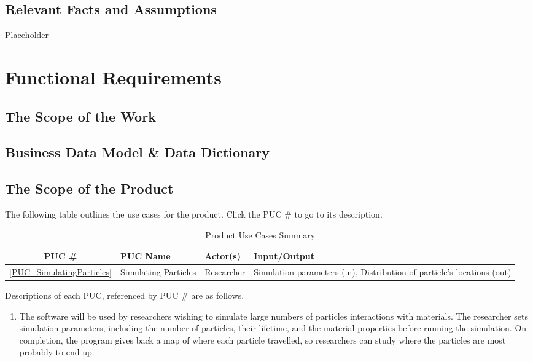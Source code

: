 \documentclass[12pt]{article}
\begin{document}
\subsection{Relevant Facts and Assumptions} %
Placeholder

\section{Functional Requirements}
\subsection{The Scope of the Work} %
\subsection{Business Data Model \& Data Dictionary} %

\subsection{The Scope of the Product}
The following table outlines the use cases for the product. Click the PUC \# to go to its description.

\begin{table}[h]
\centering
\begin{tabularx}{\textwidth}{|c|l|l|X|}
\hline
PUC \# & PUC Name & Actor(s) & Input/Output\\
\hline\hline
\ref{PUC_SimulatingParticles} & Simulating Particles & Researcher & Simulation parameters (in), Distribution of particle's locations (out)\\
\hline
\end{tabularx}
\caption{Product Use Cases Summary}
\end{table}

Descriptions of each PUC, referenced by PUC \# are as follows.
\begin{enumerate}
\item \label{PUC_SimulatingParticles} The software will be used by researchers wishing to simulate large numbers of particles interactions with materials. The researcher sets simulation parameters, including the number of particles, their lifetime, and the material properties before running the simulation. On completion, the program gives back a map of where each particle travelled, so researchers can study where the particles are most probably to end up.
\end{enumerate}
\end{document}
